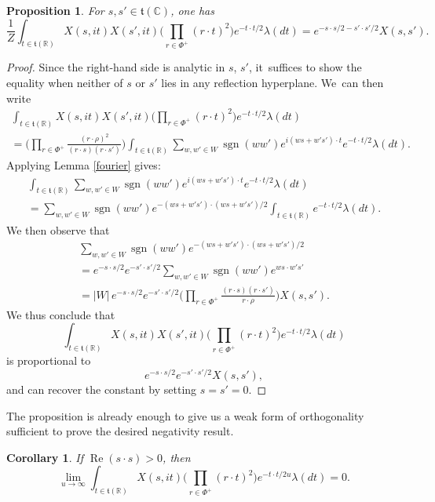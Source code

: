 \documentclass[10pt]{amsart}
\newtheorem{cor}[equation]{Corollary}
\newtheorem{prop}[equation]{Proposition}
\theoremstyle{definition}
\newcommand{\mft}{\mathfrak{t}}
\newcommand{\R}{\mathbb{R}}
\newcommand{\C}{\mathbb{C}}
\DeclareMathOperator{\RE}{Re}
\DeclareMathOperator{\sgn}{sgn}
\numberwithin{equation}{section}
\begin{document}
\begin{prop} \label{158}
For $s,s'\in \mft(\C)$, one has
\[
\frac{1}{Z}
\int_{t\in \mft(\R)} X(s,it)X(s',it)
\biggl( \prod_{r\in \Phi^+} (r\cdot t)^2 \biggr)
e^{-t\cdot t/2}
\lambda(dt)
= 
e^{-s\cdot s/2-s'\cdot s'/2}
X(s,s').
\]
\end{prop}

\begin{proof}
Since the right-hand side is analytic in $s$, $s'$, it~suffices to show
the equality when neither of $s$ or $s'$ lies in any reflection
hyperplane. We~can then write
\begin{multline*}
\int_{t\in \mft(\R)} X(s,it)X(s',it)
\biggl( \prod_{r\in \Phi^+} (r\cdot t)^2\biggr)
e^{-t\cdot t/2}
\lambda(dt)
\\
=\biggl(\prod_{r\in \Phi^+} \frac{(r\cdot \rho)^2}{(r\cdot s)(r\cdot s')}\biggr)
\int_{t\in \mft(\R)}
\sum_{w,w'\in W}
\sgn(ww')
e^{i(ws+w's')\cdot t}
e^{-t\cdot t/2}
\lambda(dt).
\end{multline*}
Applying Lemma \ref{fourier} gives:
\begin{multline*}
\int_{t\in \mft(\R)}
\sum_{w,w'\in W}
\sgn(ww')
e^{i(ws+w's')\cdot t}
e^{-t\cdot t/2}
\lambda(dt)\\[-5pt]
=\sum_{w,w'\in W}
\sgn(ww')
e^{-(ws+w's')\cdot(ws+w's')/2}
\int_{t\in \mft(\R)}
e^{-t\cdot t/2}
\lambda(dt).
\end{multline*}
We then observe that
\begin{multline*}
\sum_{w,w'\in W}
\sgn(ww')
e^{-(ws+w's')\cdot (ws+w's')/2}
\\[-5pt]
= e^{-s\cdot s/2}e^{-s'\cdot s'/2}
\sum_{w,w'\in W} \sgn(ww') e^{ws\cdot w's'}
\\
= |W| \,
e^{-s\cdot s/2} e^{-s'\cdot s'/2}
\biggl( \prod_{r\in \Phi^+}\frac{(r\cdot s)(r\cdot s')}{r\cdot \rho} \biggr)
X(s,s').
\end{multline*}
We thus conclude that
\[
\int_{t\in \mft(\R)} X(s,it)X(s',it)
\biggl( \prod_{r\in \Phi^+} (r\cdot t)^2 \biggr)
e^{-t\cdot t/2}
\lambda(dt)
\]
is proportional to
\[
e^{-s\cdot s/2}e^{-s'\cdot s'/2}
X(s,s'),
\]
and can recover the constant by setting $s=s'=0$.
\end{proof}

The proposition is already enough to give us a weak form of orthogonality sufficient
to prove the desired negativity result.

\begin{cor} \label{limit.0}
If $\RE(s\cdot s)>0$, then
\[
\lim_{u\to\infty}
\int_{t\in \mft(\R)} X(s,it)
\biggl( \prod_{r\in \Phi^+} (r\cdot t)^2 \biggr)
e^{-t\cdot t/2u}
\lambda(dt)
=
0.
\]
\end{cor}
\end{document}
